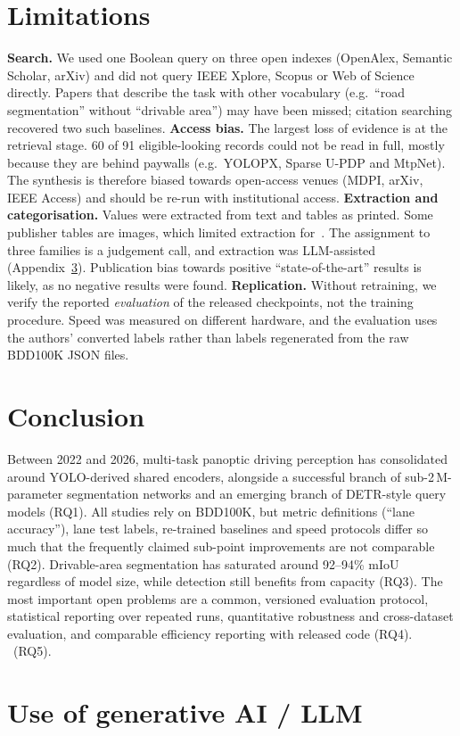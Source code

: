 \documentclass[journal,onecolumn]{IEEEtran}
\begin{document}
\section{Limitations}\label{sec:limitations}
\textbf{Search.} We used one Boolean query on three open indexes (OpenAlex, Semantic Scholar, arXiv) and did not query IEEE Xplore, Scopus or Web of Science directly. Papers that describe the task with other vocabulary (e.g.\ ``road segmentation'' without ``drivable area'') may have been missed; citation searching recovered two such baselines.
\textbf{Access bias.} The largest loss of evidence is at the retrieval stage. 60 of 91 eligible-looking records could not be read in full, mostly because they are behind paywalls (e.g.\ YOLOPX, Sparse U-PDP and MtpNet). The synthesis is therefore biased towards open-access venues (MDPI, arXiv, IEEE Access) and should be re-run with institutional access.
\textbf{Extraction and categorisation.} Values were extracted from text and tables as printed. Some publisher tables are images, which limited extraction for~\cite{liu2024fusion,mtfenet2025}. The assignment to three families is a judgement call, and extraction was LLM-assisted (Appendix~\ref{app:ai}). Publication bias towards positive ``state-of-the-art'' results is likely, as no negative results were found.
\textbf{Replication.} Without retraining, we verify the reported \emph{evaluation} of the released checkpoints, not the training procedure. Speed was measured on different hardware, and the evaluation uses the authors' converted labels rather than labels regenerated from the raw BDD100K JSON files.

\section{Conclusion}\label{sec:conclusion}
Between 2022 and 2026, multi-task panoptic driving perception has consolidated around YOLO-derived shared encoders, alongside a successful branch of sub-2\,M-parameter segmentation networks and an emerging branch of DETR-style query models (RQ1). All studies rely on BDD100K, but metric definitions (``lane accuracy''), lane test labels, re-trained baselines and speed protocols differ so much that the frequently claimed sub-point improvements are not comparable (RQ2). Drivable-area segmentation has saturated around 92--94\% mIoU regardless of model size, while detection still benefits from capacity (RQ3). The most important open problems are a common, versioned evaluation protocol, statistical reporting over repeated runs, quantitative robustness and cross-dataset evaluation, and comparable efficiency reporting with released code (RQ4). \ReplConclusion\ (RQ5).

\appendices
\section{Use of generative AI / LLM}\label{app:ai}




\end{document}
